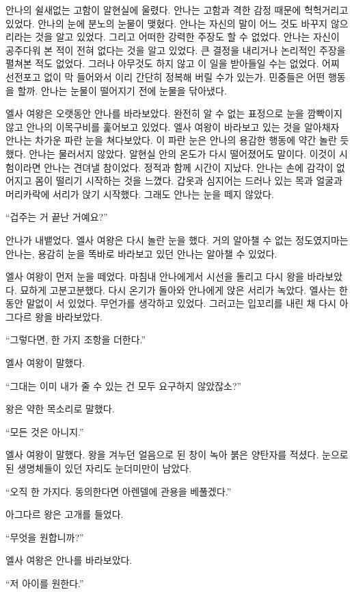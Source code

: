 안나의 쉴새없는 고함이 알현실에 울렸다. 안나는 고함과 격한 감정 때문에 헉헉거리고 있었다. 안나의 눈에 분노의 눈물이 맺혔다. 안나는 자신의 말이 어느 것도 바꾸지 않으리라는 것을 알고 있었다. 그리고 어떠한 강력한 주장도 할 수 없었다. 안나는 자신이 공주다워 본 적이 전혀 없다는 것을 알고 있었다. 큰 결정을 내리거나 논리적인 주장을 펼쳐본 적도 없었다. 그러나 아무것도 하지 않고 이 일을 받아들일 수는 없었다. 어찌 선전포고 없이 막 들어와서 이리 간단히 정복해 버릴 수가 있는가. 민중들은 어떤 행동을 할까. 안나는 눈물이 떨어지기 전에 눈물을 닦아냈다.

엘사 여왕은 오랫동안 안나를 바라보았다. 완전히 알 수 없는 표정으로 눈을 깜빡이지 않고 안나의 이목구비를 훑어보고 있었다. 엘사 여왕이 바라보고 있는 것을 알아채자 안나는 차가운 파란 눈을 쳐다보았다. 이 파란 눈은 안나의 용감한 행동에 약간 놀란 듯했다. 안나는 물러서지 않았다. 알현실 안의 온도가 다시 떨어졌어도 말이다. 이것이 시험이라면 안나는 견뎌낼 참이었다. 정적과 함께 시간이 지났다. 안나는 손에 감각이 없어지고 몸이 떨리기 시작하는 것을 느꼈다. 갑옷과 심지어는 드러나 있는 목과 얼굴과 머리카락에 서리가 앉기 시작했다. 그래도 안나는 눈을 떼지 않았다.

``겁주는 거 끝난 거예요?''

안나가 내뱉었다. 엘사 여왕은 다시 놀란 눈을 했다. 거의 알아챌 수 없는 정도였지마는 안나는, 용감히 눈을 똑바로 바라보고 있던 안나는 알아챌 수 있었다.

엘사 여왕이 먼저 눈을 떼었다. 마침내 안나에게서 시선을 돌리고 다시 왕을 바라보았다. 묘하게 고분고분했다. 다시 온기가 돌아와 안나에게 앉은 서리가 녹았다. 엘사는 한동안 말없이 서 있었다. 무언가를 생각하고 있었다. 그러고는 입꼬리를 내린 채 다시 아그다르 왕을 바라보았다.

``그렇다면, 한 가지 조항을 더한다.''

엘사 여왕이 말했다.

``그대는 이미 내가 줄 수 있는 건 모두 요구하지 않았잖소?''

왕은 약한 목소리로 말했다.

``모든 것은 아니지.''

엘사 여왕이 말했다. 왕을 겨누던 얼음으로 된 창이 녹아 붉은 양탄자를 적셨다. 눈으로 된 생명체들이 있던 자리도 눈더미만이 남았다.

``오직 한 가지다. 동의한다면 아렌델에 관용을 베풀겠다.''

아그다르 왕은 고개를 들었다.

``무엇을 원합니까?''

엘사 여왕은 안나를 바라보았다.

``저 아이를 원한다.''



